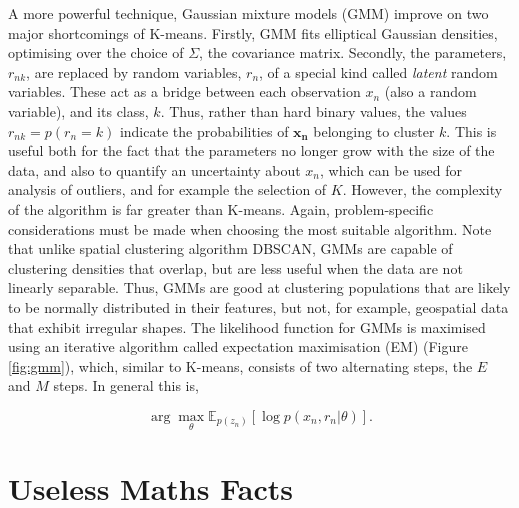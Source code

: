 \documentclass[11pt]{amsart}
\begin{document}
A more powerful technique, Gaussian mixture models (GMM) improve on two major shortcomings of K-means. Firstly, GMM fits elliptical Gaussian densities, optimising over the choice of $\Sigma$, the covariance matrix. Secondly, the parameters, $r_{nk}$, are replaced by random variables, $r_n$, of a special kind called \emph{latent} random variables. These act as a bridge between each observation $x_n$ (also a random variable), and its class, $k$. Thus, rather than hard binary values, the values $r_{nk} = p(r_n = k)$ indicate the probabilities of $\mathbf{x_n}$ belonging to cluster $k$. This is useful both for the fact that the parameters no longer grow with the size of the data, and also to quantify an uncertainty about $x_n$, which can be used for analysis of outliers, and for example the selection of $K$. However, the complexity of the algorithm is far greater than K-means. Again, problem-specific considerations must be made when choosing the most suitable algorithm. Note that unlike spatial clustering algorithm DBSCAN, GMMs are capable of clustering densities that overlap, but are less useful when the data are not linearly separable. Thus, GMMs are good at clustering populations that are likely to be normally distributed in their features, but not, for example, geospatial data that exhibit irregular shapes. The likelihood function for GMMs is maximised using an iterative algorithm called expectation maximisation (EM) (Figure \ref{fig:gmm}), which, similar to K-means, consists of two alternating steps, the $E$ and $M$ steps. In general this is,

$$\arg \max_\theta \mathbb{E}_{p(z_n)}[\log p(x_n, r_n | \theta)].$$

\section{Useless Maths Facts}
\end{document}
